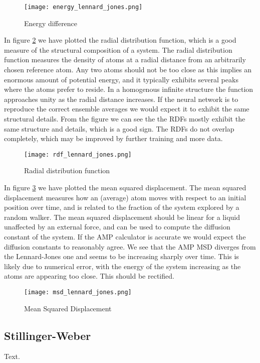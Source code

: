 \begin{figure}[h]
    \centering
    \texttt{[image: energy\_lennard\_jones.png]}
    \caption{Energy difference}
    \label{fig:energy}
\end{figure}

In figure \ref{fig:rdf} we have plotted the radial distribution function,
which is a good measure of the structural composition of a system.
The radial distribution function measures the density of atoms
at a radial distance from an arbitrarily chosen reference atom.
Any two atoms should not be too close as this implies an enormous
amount of potential energy, and it typically exhibits several
peaks where the atoms prefer to reside. In a homogenous infinite
structure the function approaches unity as the radial distance increases.
If the neural network is to reproduce the correct ensemble averages
we would expect it to exhibit the same structural details.
From the figure we can see the the RDFs mostly exhibit the same
structure and details, which is a good sign. The RDFs do not
overlap completely, which may be improved by further training and 
more data.

\begin{figure}[h]
    \centering
    \texttt{[image: rdf\_lennard\_jones.png]}
    \caption{Radial distribution function}
    \label{fig:rdf}
\end{figure}

In figure \ref{fig:msd} we have plotted the mean squared displacement.
The mean squared displacement measures how an (average) atom
moves with respect to an initial position over time,
and is related to the fraction of the system explored by a random walker.
The mean squared displacement should be linear for a liquid
unaffected by an external force, and can be used to compute
the diffusion constant of the system. If the AMP calculator is accurate
we would expect the diffusion constants to reasonably agree.
We see that the AMP MSD diverges from the Lennard-Jones one
and seems to be increasing sharply over time. This is likely
due to numerical error, with the energy of the system increasing
as the atoms are appearing too close. This should be rectified.

\begin{figure}[h]
    \centering
    \texttt{[image: msd\_lennard\_jones.png]}
    \caption{Mean Squared Displacement}
    \label{fig:msd}
\end{figure}

\subsection{Stillinger-Weber}
Text.

